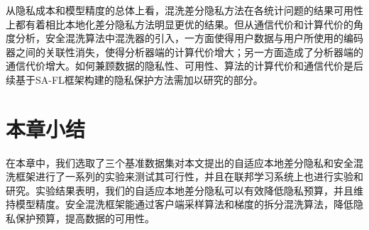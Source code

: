 从隐私成本和模型精度的总体上看，混洗差分隐私方法在各统计问题的结果可用性上都有着相比本地化差分隐私方法明显更优的结果。但从通信代价和计算代价的角度分析，安全混洗算法中混洗器的引入，一方面使得用户数据与用户所使用的编码器之间的关联性消失，使得分析器端的计算代价增大；另一方面造成了分析器端的通信代价增大。如何兼顾数据的隐私性、可用性、算法的计算代价和通信代价是后续基于SA-FL框架构建的隐私保护方法需加以研究的部分。


\section{本章小结}
在本章中，我们选取了三个基准数据集对本文提出的自适应本地差分隐私和安全混洗框架进行了一系列的实验来测试其可行性，并且在联邦学习系统上也进行实验和研究。实验结果表明，我们的自适应本地差分隐私可以有效降低隐私预算，并且维持模型精度。安全混洗框架能通过客户端采样算法和梯度的拆分混洗算法，降低隐私保护预算，提高数据的可用性。

